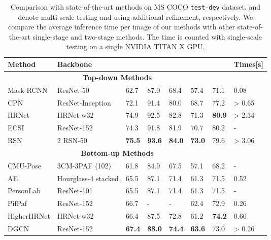 \documentclass[sigconf]{acmart}
\begin{document}
\begin{table*}[ht]
\renewcommand{\arraystretch}{1.0}
  \caption{Comparison with state-of-the-art methods on MS COCO \texttt{test-dev} dataset.  and  denote multi-scale testing and using additional refinement, respectively.
  We compare the average inference time per image of our methods with other state-of-the-art single-stage and two-stage methods. The time is counted with single-scale testing on a single NVIDIA TITAN X GPU.
  }
  \label{tab:sota}
  \begin{tabular}{p{110 pt}<{\centering}p{110 pt}<{\centering}p{30 pt}<{\centering}p{30 pt}<{\centering}p{30 pt}<{\centering}p{30 pt}<{\centering}p{30 pt}<{\centering}p{30 pt}<{\centering}}
    \toprule
    Method & Backbone &  &  &  &  &  & Times[s]\\
    \midrule
    \multicolumn{7}{c}{\textbf{Top-down Methods}} \\
    \midrule
    Mask-RCNN \cite{he2017mask} & ResNet-50 & 62.7 & 87.0 & 68.4 & 57.4 & 71.1 & 0.08\\
    CPN \cite{chen2018cascaded} & ResNet-Inception & 72.1 & 91.4 & 80.0 & 68.7 & 77.2 & > 0.65\\
    HRNet \cite{sun2019deep} &  HRNet-w32 &  74.9 &  92.5 &  82.8 &  71.3 &  \textbf{80.9} &  > 2.34\\
ECSI \cite{su2019multi} &  ResNet-152 & 74.3 & 91.8 & 81.9 & 70.7 &  80.2 & -\\
    RSN \cite{cai2020learning} &  2  RSN-50 &  \textbf{75.5} &  \textbf{93.6} &  \textbf{84.0} &  \textbf{73.0} &  79.6 &  > 3.06\\
    \midrule
    \multicolumn{7}{c}{\textbf{Bottom-up Methods}} \\
    \midrule
    CMU-Pose \cite{cao2017realtime} & 3CM-3PAF (102) & 61.8 & 84.9 & 67.5 & 57.1 & 68.2 &-\\
    AE \cite{newell2016associative} & Hourglass-4 stacked & 65.5 & 87.1 & 71.4 & 61.3 & 71.5 & 0.52\\
    PersonLab \cite{papandreou2018personlab} & ResNet-101 & 65.5 & 87.1 & 71.4 & 61.3 & 71.5 &-\\
    PifPaf \cite{kreiss2019pifpaf} & ResNet-152 & 66.7 & - & - & 62.4 & 72.9 & 0.26\\
    HigherHRNet \cite{cheng2020higherhrnet} &  HRNet-w32 & 66.4 &  87.5 & 72.8 & 61.2 &  \textbf{74.2} &  0.60\\
DGCN \cite{qiu2020dgcn} & ResNet-152 &  \textbf{67.4} &  \textbf{88.0} &  \textbf{74.4} &  \textbf{63.6} & 73.0 & > 0.26\\

\end{tabular}
\end{table*}
\end{document}
